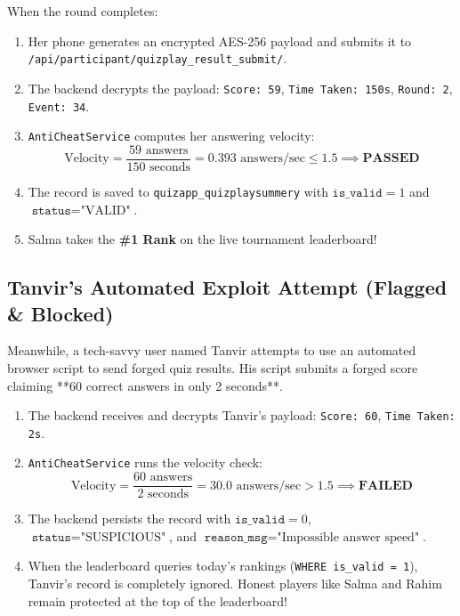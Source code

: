 When the round completes:
\begin{enumerate}
    \item Her phone generates an encrypted AES-256 payload and submits it to \texttt{/api/participant/quizplay\_result\_submit/}.
    \item The backend decrypts the payload: \texttt{Score: 59}, \texttt{Time Taken: 150s}, \texttt{Round: 2}, \texttt{Event: 34}.
    \item \texttt{AntiCheatService} computes her answering velocity:
    $$\text{Velocity} = \frac{59\text{ answers}}{150\text{ seconds}} = 0.393\text{ answers/sec} \le 1.5 \implies \textbf{PASSED}$$
    \item The record is saved to \texttt{quizapp\_quizplaysummery} with $\texttt{is\_valid} = 1$ and $\texttt{status} = \text{"VALID"}$.
    \item Salma takes the \textbf{\#1 Rank} on the live tournament leaderboard!
\end{enumerate}

\subsection{Tanvir's Automated Exploit Attempt (Flagged \& Blocked)}
Meanwhile, a tech-savvy user named Tanvir attempts to use an automated browser script to send forged quiz results. His script submits a forged score claiming **60 correct answers in only 2 seconds**.

\begin{enumerate}
    \item The backend receives and decrypts Tanvir's payload: \texttt{Score: 60}, \texttt{Time Taken: 2s}.
    \item \texttt{AntiCheatService} runs the velocity check:
    $$\text{Velocity} = \frac{60\text{ answers}}{2\text{ seconds}} = 30.0\text{ answers/sec} > 1.5 \implies \textbf{FAILED}$$
    \item The backend persists the record with $\texttt{is\_valid} = 0$, $\texttt{status} = \text{"SUSPICIOUS"}$, and $\texttt{reason\_msg} = \text{"Impossible answer speed"}$.
    \item When the leaderboard queries today's rankings (\texttt{WHERE is\_valid = 1}), Tanvir's record is completely ignored. Honest players like Salma and Rahim remain protected at the top of the leaderboard!
\end{enumerate}

